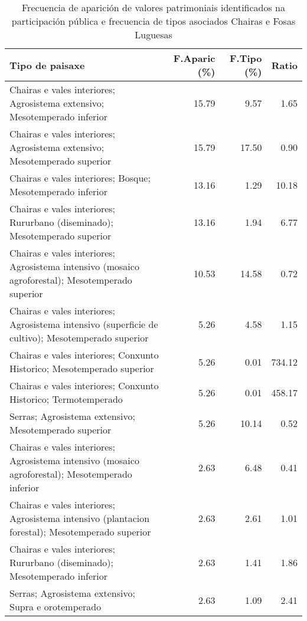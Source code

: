 \begin{table}[p]
\centering
\caption{Frecuencia de aparición de valores patrimoniais identificados na participación pública e frecuencia de tipos asociados Chairas e Fosas Luguesas} 
\label{vsixotpat6}
\begin{tabular}{lrrr}
  \hline
Tipo de paisaxe & F.Aparic (\%) & F.Tipo (\%) & Ratio \\ 
  \hline
Chairas e vales interiores; Agrosistema extensivo; Mesotemperado inferior & 15.79 & 9.57 & 1.65 \\ 
  Chairas e vales interiores; Agrosistema extensivo; Mesotemperado superior & 15.79 & 17.50 & 0.90 \\ 
  Chairas e vales interiores; Bosque; Mesotemperado inferior & 13.16 & 1.29 & 10.18 \\ 
  Chairas e vales interiores; Rururbano (diseminado); Mesotemperado superior & 13.16 & 1.94 & 6.77 \\ 
  Chairas e vales interiores; Agrosistema intensivo (mosaico agroforestal); Mesotemperado superior & 10.53 & 14.58 & 0.72 \\ 
  Chairas e vales interiores; Agrosistema intensivo (superficie de cultivo); Mesotemperado superior & 5.26 & 4.58 & 1.15 \\ 
  Chairas e vales interiores; Conxunto Historico; Mesotemperado superior & 5.26 & 0.01 & 734.12 \\ 
  Chairas e vales interiores; Conxunto Historico; Termotemperado & 5.26 & 0.01 & 458.17 \\ 
  Serras; Agrosistema extensivo; Mesotemperado superior & 5.26 & 10.14 & 0.52 \\ 
  Chairas e vales interiores; Agrosistema intensivo (mosaico agroforestal); Mesotemperado inferior & 2.63 & 6.48 & 0.41 \\ 
  Chairas e vales interiores; Agrosistema intensivo (plantacion forestal); Mesotemperado superior & 2.63 & 2.61 & 1.01 \\ 
  Chairas e vales interiores; Rururbano (diseminado); Mesotemperado inferior & 2.63 & 1.41 & 1.86 \\ 
  Serras; Agrosistema extensivo; Supra e orotemperado & 2.63 & 1.09 & 2.41 \\ 
   \hline
\end{tabular}
\end{table}
